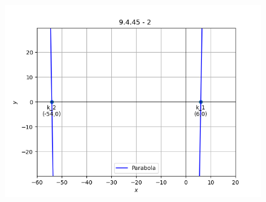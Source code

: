 \documentclass[journal]{IEEEtran}
\numberwithin{equation}{enumi}
\numberwithin{figure}{enumi}
\begin{document}
\begin{figure}[H]
    \centering
    \includegraphics[width=0.5\columnwidth]{figs/graph1_2.png}
    \caption*{}
    \label{fig:placeholder}
\end{figure}
\end{document}
